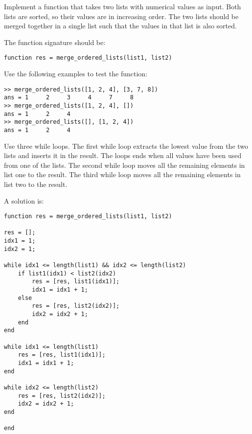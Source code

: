 \begin{ex}
Implement a function that takes two lists
with numerical values as input.
Both lists are sorted, so their values are in 
increasing order.
The two lists should be merged together
in a single list such that the values in 
that list is also sorted.

The function signature should be:
\begin{lstlisting}
function res = merge_ordered_lists(list1, list2)
\end{lstlisting}
Use the following examples to test the function:
\begin{lstlisting}
>> merge_ordered_lists([1, 2, 4], [3, 7, 8])
ans = 1     2     3     4     7     8
>> merge_ordered_lists([1, 2, 4], [])
ans = 1     2     4
>> merge_ordered_lists([], [1, 2, 4])
ans = 1     2     4
\end{lstlisting}
\begin{hint}
Use three while loops.
The first while loop extracts the lowest value from 
the two lists and inserts it in the result.
The loops ends when all values have been used from 
one of the lists.
The second while loop moves all the remaining elements 
in list one to the result.
The third while loop moves all the remaining elements 
in list two to the result.
\end{hint}
\begin{sol}
A solution is:
\begin{lstlisting}
function res = merge_ordered_lists(list1, list2)

res = [];
idx1 = 1;
idx2 = 1;

while idx1 <= length(list1) && idx2 <= length(list2)
    if list1(idx1) < list2(idx2)
        res = [res, list1(idx1)];
        idx1 = idx1 + 1;
    else
        res = [res, list2(idx2)];
        idx2 = idx2 + 1;
    end
end

while idx1 <= length(list1)
    res = [res, list1(idx1)];
    idx1 = idx1 + 1;
end

while idx2 <= length(list2)
    res = [res, list2(idx2)];
    idx2 = idx2 + 1;
end

end
\end{lstlisting}
\end{sol}
\end{ex}



